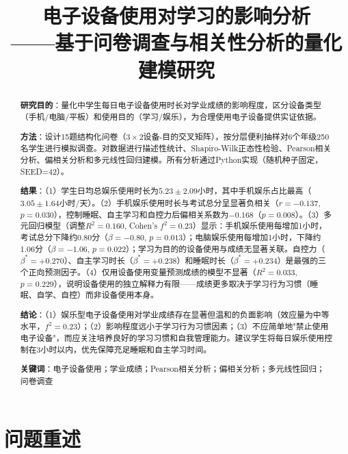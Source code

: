 \documentclass[11pt]{ctexart}
\begin{document}
\title{\textbf{电子设备使用对学习的影响分析}\\ \large ——基于问卷调查与相关性分析的量化建模研究}
\author{}
\date{}
\maketitle

\begin{abstract}
\noindent
\textbf{研究目的}：量化中学生每日电子设备使用时长对学业成绩的影响程度，区分设备类型（手机/电脑/平板）和使用目的（学习/娱乐），为合理使用电子设备提供实证依据。

\textbf{方法}：设计15题结构化问卷（$3\times2$设备-目的交叉矩阵），按分层便利抽样对6个年级250名学生进行模拟调查。对数据进行描述性统计、Shapiro-Wilk正态性检验、Pearson相关分析、偏相关分析和多元线性回归建模。所有分析通过Python实现（随机种子固定，SEED=42）。

\textbf{结果}：（1）学生日均总娱乐使用时长为$5.23\pm2.09$小时，其中手机娱乐占比最高（$3.05\pm1.64$小时/天）。（2）手机娱乐使用时长与考试总分呈显著负相关（$r=-0.137$, $p=0.030$），控制睡眠、自主学习和自控力后偏相关系数为$-0.168$（$p=0.008$）。（3）多元回归模型（调整$R^2=0.160$, Cohen's $f^2=0.23$）显示：手机娱乐使用每增加1小时，考试总分下降约0.80分（$\beta=-0.80$, $p=0.013$）；电脑娱乐使用每增加1小时，下降约1.06分（$\beta=-1.06$, $p=0.022$）；学习为目的的设备使用与成绩无显著关联。自控力（$\beta^*=+0.270$）、自主学习时长（$\beta^*=+0.238$）和睡眠时长（$\beta^*=+0.234$）是最强的三个正向预测因子。（4）仅用设备使用变量预测成绩的模型不显著（$R^2=0.033$, $p=0.229$），说明设备使用的独立解释力有限——成绩更多取决于学习行为习惯（睡眠、自学、自控）而非设备使用本身。

\textbf{结论}：（1）娱乐型电子设备使用对学业成绩存在显著但温和的负面影响（效应量为中等水平，$f^2=0.23$）；（2）影响程度远小于学习行为习惯因素；（3）不应简单地"禁止使用电子设备"，而应关注培养良好的学习习惯和自我管理能力。建议学生将每日娱乐使用控制在3小时以内，优先保障充足睡眠和自主学习时间。

\vspace{0.5em}
\noindent\textbf{关键词}：电子设备使用；学业成绩；Pearson相关分析；偏相关分析；多元线性回归；问卷调查
\end{abstract}

\newpage
\tableofcontents
\newpage

\section{问题重述}
\end{document}
